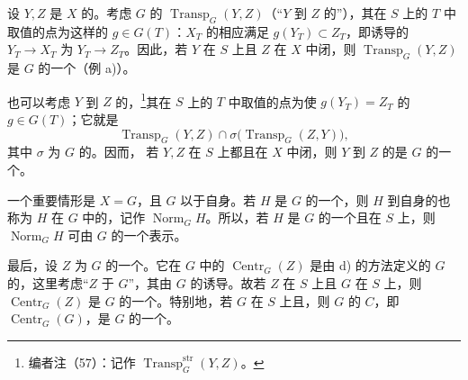设 $Y,Z$ 是 $X$ 的。考虑 $G$ 的 $\operatorname{Transp}_G(Y,Z)$（“$Y$ 到 $Z$ 的”），其在 $S$ 上的 $T$ 中取值的点为这样的 $g\in G(T)$：$X_T$ 的相应满足 $g(Y_T)\subset Z_T$，即诱导的 $Y_T\to X_T$ 为 $Y_T\to Z_T$。因此，若 $Y$ 在 $S$ 上且 $Z$ 在 $X$ 中闭，则 $\operatorname{Transp}_G(Y,Z)$ 是 $G$ 的一个（例 a)）。

也可以考虑 $Y$ 到 $Z$ 的，\footnote{编者注（57）：记作 $\operatorname{Transp}^{\mathrm{str}}_G(Y,Z)$。}其在 $S$ 上的 $T$ 中取值的点为使 $g(Y_T)=Z_T$ 的 $g\in G(T)$；它就是
\[
\operatorname{Transp}_G(Y,Z)\cap\sigma\bigl(\operatorname{Transp}_G(Z,Y)\bigr),
\]
其中 $\sigma$ 为 $G$ 的。因而，
若 $Y,Z$ 在 $S$ 上都且在 $X$ 中闭，则 $Y$ 到 $Z$ 的是 $G$ 的一个。

一个重要情形是 $X=G$，且 $G$ 以于自身。若 $H$ 是 $G$ 的一个，则 $H$ 到自身的也称为 $H$ 在 $G$ 中的，记作 $\operatorname{Norm}_G H$。所以，若 $H$ 是 $G$ 的一个且在 $S$ 上，则 $\operatorname{Norm}_G H$ 可由 $G$ 的一个表示。

最后，设 $Z$ 为 $G$ 的一个。它在 $G$ 中的 $\operatorname{Centr}_G(Z)$ 是由 d) 的方法定义的 $G$ 的，这里考虑“$Z$ 于 $G$”，其由 $G$ 的诱导。故若 $Z$ 在 $S$ 上且 $G$ 在 $S$ 上，则 $\operatorname{Centr}_G(Z)$ 是 $G$ 的一个。特别地，若 $G$ 在 $S$ 上且，则 $G$ 的 $C$，即 $\operatorname{Centr}_G(G)$，是 $G$ 的一个。

